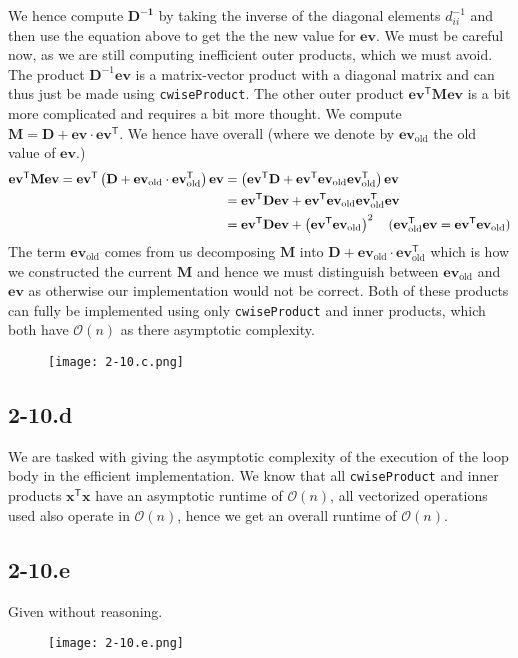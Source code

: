 \documentclass{article}
\begin{document}
\noindent We hence compute $\mathbf{D^{-1}}$ by taking the inverse of the diagonal elements $d_{ii}^{-1}$ and then use the equation above to get the the new value for $\mathbf{ev}$. We must be careful now, as we are still computing inefficient outer products, which we must avoid. The product $\mathbf{D}^{-1}\mathbf{ev}$ is a matrix-vector product with a diagonal matrix and can thus just be made using \verb|cwiseProduct|. The other outer product $\mathbf{ev}^{\mathsf{T}}\mathbf{M}\mathbf{ev}$ is a bit more complicated and requires a bit more thought. We compute $\mathbf{M} = \mathbf{D} + \mathbf{ev} \cdot \mathbf{ev}^{\mathsf{T}}$. We hence have overall (where we denote by $\mathbf{ev}_{\text{old}}$ the old value of $\mathbf{ev}$.)
\begin{align*}
    \mathbf{ev}^{\mathsf{T}} \mathbf{M}\mathbf{ev} = \mathbf{ev}^{\mathsf{T}}\left(\mathbf{D} + \mathbf{ev}_{\text{old}} \cdot \mathbf{ev}_{\text{old}}^{\mathsf{T}}\right)\mathbf{ev} &= \left(\mathbf{ev}^{\mathsf{T}}\mathbf{D} + \mathbf{ev}^{\mathsf{T}}\mathbf{ev}_{\text{old}}\mathbf{ev}_{\text{old}}^{\mathsf{T}}\right)\mathbf{ev} \\
    &=\mathbf{ev}^{\mathsf{T}}\mathbf{D}\mathbf{ev} + \mathbf{ev}^{\mathsf{T}}\mathbf{ev}_{\text{old}}\mathbf{ev}_{\text{old}}^{\mathsf{T}}\mathbf{ev} \\
    &=\mathbf{ev}^{\mathsf{T}}\mathbf{D}\mathbf{ev} + \left(\mathbf{ev}^{\mathsf{T}}\mathbf{ev}_{\text{old}}\right)^{2} \quad \text{($ \mathbf{ev}_{\text{old}}^{\mathsf{T}}\mathbf{ev} = \mathbf{ev}^{\mathsf{T}}\mathbf{ev}_{\text{old}}$)}
\end{align*}
The term $\mathbf{ev}_{\text{old}}$ comes from us decomposing $\mathbf{M}$ into $\mathbf{D} + \mathbf{ev}_{\text{old}} \cdot \mathbf{ev}_{\text{old}}^{\mathsf{T}}$ which is how we constructed the current $\mathbf{M}$ and hence we must distinguish between $\mathbf{ev}_{\text{old}}$ and $\mathbf{ev}$ as otherwise our implementation would not be correct.
Both of these products can fully be implemented using only \verb|cwiseProduct| and inner products, which both have $\mathcal{O}\left(n\right)$ as there asymptotic complexity.

\begin{figure}[!hbt]
    \centering
\texttt{[image: 2-10.c.png]}
\end{figure}


\subsection*{2-10.d} 
We are tasked with giving the asymptotic complexity of the execution of the loop body in the efficient implementation. We know that all \verb|cwiseProduct| and inner products $\mathbf{x}^{\mathsf{T}}\mathbf{x}$ have an asymptotic runtime of $\mathcal{O}\left(n\right)$, all vectorized operations used also operate in $\mathcal{O}\left(n\right)$, hence we get an overall runtime of $\mathcal{O}\left(n\right)$.
\subsection*{2-10.e}
Given without reasoning.
\begin{figure}[!hbt]
    \centering
\texttt{[image: 2-10.e.png]}
\end{figure}
\end{document}
